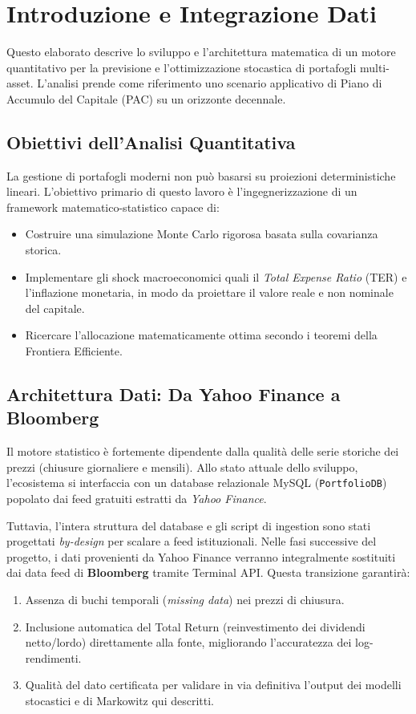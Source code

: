 \chapter{Introduzione e Integrazione Dati}

Questo elaborato descrive lo sviluppo e l'architettura matematica di un motore quantitativo per la previsione e l'ottimizzazione stocastica di portafogli multi-asset. L'analisi prende come riferimento uno scenario applicativo di Piano di Accumulo del Capitale (PAC) su un orizzonte decennale.

\section{Obiettivi dell'Analisi Quantitativa}
La gestione di portafogli moderni non può basarsi su proiezioni deterministiche lineari. L'obiettivo primario di questo lavoro \`e l'ingegnerizzazione di un framework matematico-statistico capace di:
\begin{itemize}
    \item Costruire una simulazione Monte Carlo rigorosa basata sulla covarianza storica.
    \item Implementare gli shock macroeconomici quali il \emph{Total Expense Ratio} (TER) e l'inflazione monetaria, in modo da proiettare il valore reale e non nominale del capitale.
    \item Ricercare l'allocazione matematicamente ottima secondo i teoremi della Frontiera Efficiente.
\end{itemize}

\section{Architettura Dati: Da Yahoo Finance a Bloomberg}
Il motore statistico \`e fortemente dipendente dalla qualit\`a delle serie storiche dei prezzi (chiusure giornaliere e mensili). Allo stato attuale dello sviluppo, l'ecosistema si interfaccia con un database relazionale MySQL (\texttt{PortfolioDB}) popolato dai feed gratuiti estratti da \emph{Yahoo Finance}.

Tuttavia, l'intera struttura del database e gli script di ingestion sono stati progettati \emph{by-design} per scalare a feed istituzionali. Nelle fasi successive del progetto, i dati provenienti da Yahoo Finance verranno integralmente sostituiti dai data feed di \textbf{Bloomberg} tramite Terminal API. Questa transizione garantir\`a:
\begin{enumerate}
    \item Assenza di buchi temporali (\emph{missing data}) nei prezzi di chiusura.
    \item Inclusione automatica del Total Return (reinvestimento dei dividendi netto/lordo) direttamente alla fonte, migliorando l'accuratezza dei log-rendimenti.
    \item Qualit\`a del dato certificata per validare in via definitiva l'output dei modelli stocastici e di Markowitz qui descritti.
\end{enumerate}
